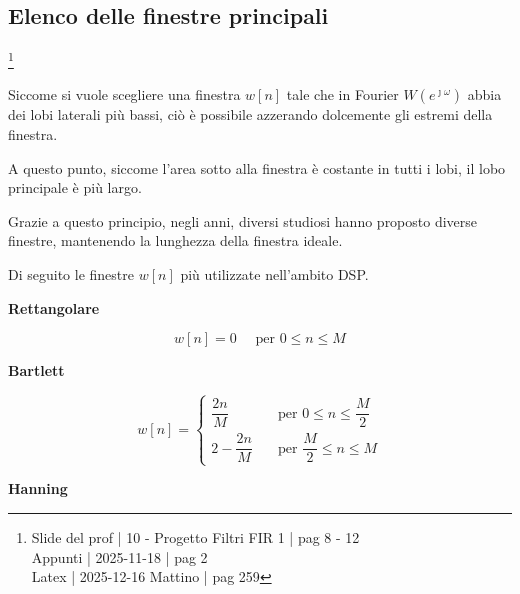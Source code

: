 \newpage 

\subsection{Elenco delle finestre principali} \label{subsec: Elenco delle finestre principali}

\footnote{ 
    Slide del prof | 10 - Progetto Filtri FIR 1 | pag 8 - 12\\
    Appunti | 2025-11-18 | pag 2 \\ 
    Latex | 2025-12-16 Mattino | pag 259 
} 

Siccome si vuole scegliere una finestra $w \left[ n\right]$ tale che in Fourier $W \left(e^{\jmath \omega}\right)$ abbia dei lobi laterali più bassi, 
ciò è possibile azzerando dolcemente gli estremi della finestra. \newline 

A questo punto, siccome l'area sotto alla finestra è costante in tutti i lobi, il lobo principale è più largo. \newline 

Grazie a questo principio, negli anni, diversi studiosi hanno proposto diverse finestre, 
mantenendo la lunghezza della finestra ideale. \newline 

Di seguito le finestre $w \left[ n\right]$ più utilizzate nell'ambito DSP. \newline 

\textbf{Rettangolare} \newline 

{
    \Large 
    \begin{equation}
        w \left[ n\right] = 0 \quad \text{ per } 0 \leq n \leq M
    \end{equation}
}

\textbf{Bartlett} \newline 

{
    \Large 
    \begin{equation}
        w \left[ n\right] 
        = 
        \begin{cases}
            \dfrac{2 n}{M} \quad &\text{per } 0 \leq n \leq \dfrac{M}{2} 
            \\ 
            2 - \dfrac{2 n}{M} \quad &\text{per }\dfrac{M}{2} \leq n \leq M 
        \end{cases}
    \end{equation}
}

\textbf{Hanning} \newline 

